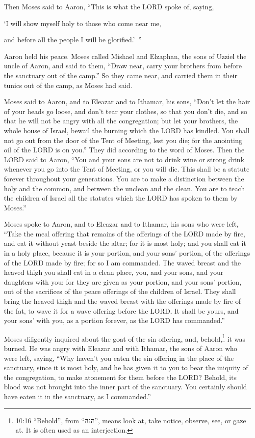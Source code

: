 \myverse{}Then Moses said to Aaron, “This is what the LORD spoke of, saying,

‘I will show myself holy to those who come near me,

and before all the people I will be glorified.’ ”

Aaron held his peace. \myverse{}Moses called Mishael and Elzaphan, the sons of Uzziel the uncle of Aaron, and
said to them, “Draw near, carry your brothers from before the sanctuary out of the camp.”
\myverse{}So they came near, and carried them in their tunics out of the camp, as Moses
had said.


\myverse{}Moses said to Aaron, and to Eleazar and to Ithamar, his sons,
“Don’t let the hair of your heads go loose, and don’t tear your clothes, so that you don’t die, and so
that he will not be angry with all the congregation; but let your brothers, the whole house of Israel,
bewail the burning which the LORD has kindled.
\myverse{}You shall not go out from the door of the Tent of Meeting, lest you die; for
the anointing oil of the LORD is on you.” They did according to the word of Moses.
\myverse{}Then the LORD said to Aaron,
\myverse{}“You and your sons are not to drink wine or strong drink whenever you go into
the Tent of Meeting, or you will die. This shall be a statute forever throughout your generations.
\myverse{}You are to make a distinction between the holy and the common, and between
the unclean and the clean.
\myverse{}You are to teach the children of Israel all the statutes which the LORD has
spoken to them by Moses.”


\myverse{}Moses spoke to Aaron, and to Eleazar and to Ithamar, his sons
who were left, “Take the meal offering that remains of the offerings of the LORD made by fire, and eat
it without yeast beside the altar; for it is most holy;
\myverse{}and you shall eat it in a holy place, because it is your portion, and your
sons’ portion, of the offerings of the LORD made by fire; for so I am commanded.
\myverse{}The waved breast and the heaved thigh you shall eat in a clean place, you,
and your sons, and your daughters with you: for they are given as your portion, and your sons’ portion,
out of the sacrifices of the peace offerings of the children of Israel.
\myverse{}They shall bring the heaved thigh and the waved breast with the offerings
made by fire of the fat, to wave it for a wave offering before the LORD. It shall be yours, and your sons’
with you, as a portion forever, as the LORD has commanded.”


\myverse{}Moses diligently inquired about the goat of the sin offering,
and, behold,\footnote{10:16 “Behold”, from “הִנֵּה”, means look at, take notice, observe, see, or gaze at. It is
	often used as an interjection.} it was burned. He was angry with Eleazar and with Ithamar, the
sons of Aaron who were left, saying,
\myverse{}“Why haven’t you eaten the sin offering in the place of the sanctuary, since
it is most holy, and he has given it to you to bear the iniquity of the congregation, to make atonement
for them before the LORD?
\myverse{}Behold, its blood was not brought into the inner part of the sanctuary. You
certainly should have eaten it in the sanctuary, as I commanded.”


